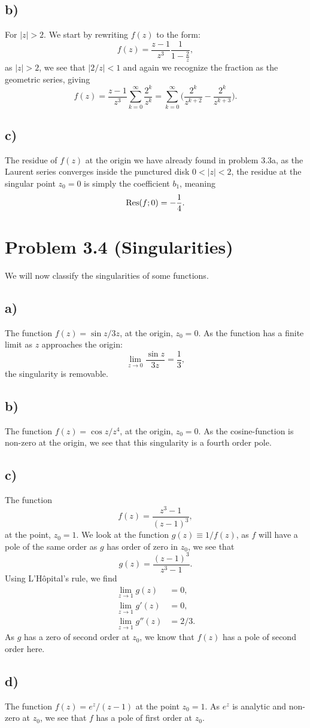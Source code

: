 \documentclass[a4paper, 11pt, titlepage, english]{article}
\begin{document}
\subsection*{b)}
For $|z| > 2$. We start by rewriting $f(z)$ to the form:
$$f(z) = \frac{z-1}{z^3} \frac{1}{1-\frac{2}{z}},$$
as $|z|>2$, we see that $|2/z|<1$ and again we recognize the fraction as the geometric series, giving
$$f(z) =  \frac{z-1}{z^3} \sum_{k=0}^\infty \frac{2^k}{z^k} = \sum_{k=0}^\infty \bigg(\frac{2^k}{z^{k+2}} - \frac{2^k}{z^{k+3}}\bigg).$$

\subsection*{c)}
The residue of $f(z)$ at the origin we have already found in problem 3.3a, as the Laurent series converges inside the punctured disk $0 < |z| < 2$, the residue at the singular point $z_0 = 0$ is simply the coefficient $b_1$, meaning
$${\rm Res}(f;0) = -\frac{1}{4}.$$

\clearpage

\section*{Problem 3.4 (Singularities)}
We will now classify the singularities of some functions.
\subsection*{a)}
The function $f(z) = {\sin z}/{3z}$, at the origin, $z_0 = 0$. As the function has a finite limit as $z$ approaches the origin:
$$\lim_{z\to 0} \frac{\sin z}{3z} = \frac{1}{3},$$
the singularity is removable.

\subsection*{b)}
The function $f(z) = {\cos z}/{z^4}$, at the origin, $z_0 = 0$. As the cosine-function is non-zero at the origin, we see that this singularity is a fourth order pole.

\subsection*{c)}
The function
$$f(z) = \frac{z^3-1}{(z-1)^3},$$
at the point, $z_0 = 1$. We look at the function $g(z) \equiv 1/ f(z)$, as $f$ will have a pole of the same order as $g$ has order of zero in $z_0$, we see that
$$g(z) = \frac{(z-1)^3}{z^3 - 1}.$$
Using L'Hôpital's rule, we find
\begin{align*}
\lim_{z\to1} g(z) &= 0, \\
\lim_{z\to1} g'(z) &= 0, \\
\lim_{z\to1} g''(z) &= 2/3.
\end{align*}
As $g$ has a zero of second order at $z_0$, we know that $f(z)$ has a pole of second order here.

\subsection*{d)}
The function $f(z) = e^z/(z-1)$ at the point $z_0 = 1$. As $e^z$ is analytic and non-zero at $z_0$, we see that $f$ has a pole of first order at $z_0$.
\end{document}
